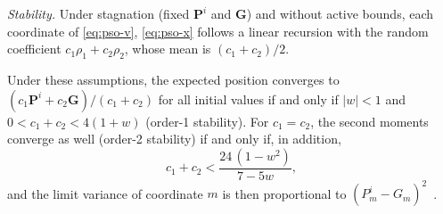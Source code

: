 \makeatletter{}\makeatother
%
\emph{Stability.} Under stagnation (fixed $\mathbf P^i$ and $\mathbf G$) and without active bounds, each coordinate of \eqref{eq:pso-v}, \eqref{eq:pso-x} follows a linear recursion with the random coefficient $c_1\rho_1+c_2\rho_2$, whose mean is $(c_1+c_2)/2$.
\begin{proposition}\label{prop:pso-stability}
Under these assumptions, the expected position converges to $(c_1\mathbf P^i+c_2\mathbf G)/(c_1+c_2)$ for all initial values if and only if $\lvert w\rvert<1$ and $0<c_1+c_2<4(1+w)$ (order-1 stability). For $c_1=c_2$, the second moments converge as well (order-2 stability) if and only if, in addition,
\begin{equation}
c_1+c_2<\frac{24\,(1-w^2)}{7-5w},
\label{eq:poli}
\end{equation}
and the limit variance of coordinate $m$ is then proportional to $(P^i_m-G_m)^2$~\cite{Poli2009}.
\end{proposition}
